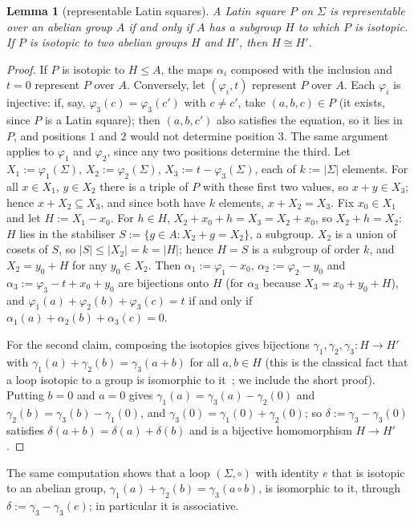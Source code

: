 \documentclass[11pt]{article}
\newtheorem{lemma}[theorem]{Lemma}
\theoremstyle{definition}
\theoremstyle{remark}
\begin{document}
\begin{lemma}[representable Latin squares]\label{g:lem:latinrep}
A Latin square $P$ on $\Sigma$ is representable over an abelian group $A$ if and only if $A$ has a subgroup $H$ to which $P$ is isotopic. If $P$ is isotopic to two abelian groups $H$ and $H'$, then $H\cong H'$.
\end{lemma}
\begin{proof}
If $P$ is isotopic to $H\le A$, the maps $\alpha_i$ composed with the inclusion and $t=0$ represent $P$ over $A$. Conversely, let $(\varphi_i,t)$ represent $P$ over $A$. Each $\varphi_i$ is injective: if, say, $\varphi_3(c)=\varphi_3(c')$ with $c\ne c'$, take $(a,b,c)\in P$ (it exists, since $P$ is a Latin square); then $(a,b,c')$ also satisfies the equation, so it lies in $P$, and positions $1$ and $2$ would not determine position $3$. The same argument applies to $\varphi_1$ and $\varphi_2$, since any two positions determine the third. Let $X_1:=\varphi_1(\Sigma)$, $X_2:=\varphi_2(\Sigma)$, $X_3:=t-\varphi_3(\Sigma)$, each of $k:=|\Sigma|$ elements. For all $x\in X_1$, $y\in X_2$ there is a triple of $P$ with these first two values, so $x+y\in X_3$; hence $x+X_2\subseteq X_3$, and since both have $k$ elements, $x+X_2=X_3$. Fix $x_0\in X_1$ and let $H:=X_1-x_0$. For $h\in H$, $X_2+x_0+h=X_3=X_2+x_0$, so $X_2+h=X_2$: $H$ lies in the stabiliser $S:=\{g\in A:X_2+g=X_2\}$, a subgroup. $X_2$ is a union of cosets of $S$, so $|S|\le|X_2|=k=|H|$; hence $H=S$ is a subgroup of order $k$, and $X_2=y_0+H$ for any $y_0\in X_2$. Then $\alpha_1:=\varphi_1-x_0$, $\alpha_2:=\varphi_2-y_0$ and $\alpha_3:=\varphi_3-t+x_0+y_0$ are bijections onto $H$ (for $\alpha_3$ because $X_3=x_0+y_0+H$), and $\varphi_1(a)+\varphi_2(b)+\varphi_3(c)=t$ if and only if $\alpha_1(a)+\alpha_2(b)+\alpha_3(c)=0$.

For the second claim, composing the isotopies gives bijections $\gamma_1,\gamma_2,\gamma_3\colon H\to H'$ with $\gamma_1(a)+\gamma_2(b)=\gamma_3(a+b)$ for all $a,b\in H$ (this is the classical fact that a loop isotopic to a group is isomorphic to it~\cite{Alb43}; we include the short proof). Putting $b=0$ and $a=0$ gives $\gamma_1(a)=\gamma_3(a)-\gamma_2(0)$ and $\gamma_2(b)=\gamma_3(b)-\gamma_1(0)$, and $\gamma_3(0)=\gamma_1(0)+\gamma_2(0)$; so $\delta:=\gamma_3-\gamma_3(0)$ satisfies $\delta(a+b)=\delta(a)+\delta(b)$ and is a bijective homomorphism $H\to H'$.
\end{proof}

The same computation shows that a loop $(\Sigma,\circ)$ with identity $e$ that is isotopic to an abelian group, $\gamma_1(a)+\gamma_2(b)=\gamma_3(a\circ b)$, is isomorphic to it, through $\delta:=\gamma_3-\gamma_3(e)$; in particular it is associative.
\end{document}
